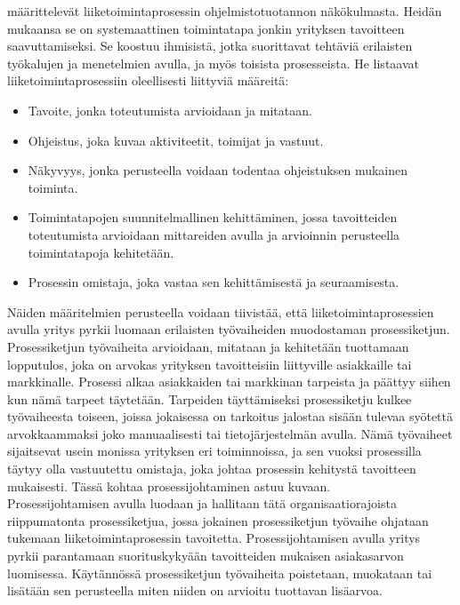 \documentclass[finnish,12pt,a4paper,pdftex]{article}
\begin{document}
\noindent \cite{okaytannot} määrittelevät liiketoimintaprosessin ohjelmistotuotannon näkökulmasta. Heidän mukaansa se on systemaattinen toimintatapa jonkin yrityksen tavoitteen saavuttamiseksi. Se koostuu ihmisistä, jotka suorittavat tehtäviä erilaisten työkalujen ja menetelmien avulla, ja myös toisista prosesseista. He listaavat liiketoimintaprosessiin oleellisesti liittyviä määreitä:

\begin{itemize}
\setlength{\itemsep}{0pt}
    \item Tavoite, jonka toteutumista arvioidaan ja mitataan.
    \item Ohjeistus, joka kuvaa aktiviteetit, toimijat ja vastuut.
    \item Näkyvyys, jonka perusteella voidaan todentaa ohjeistuksen mukainen toiminta.
    \item Toimintatapojen suunnitelmallinen kehittäminen, jossa tavoitteiden toteutumista arvioidaan mittareiden avulla ja arvioinnin perusteella toimintatapoja kehitetään.
    \item Prosessin omistaja, joka vastaa sen kehittämisestä ja seuraamisesta.
\end{itemize}

Näiden määritelmien perusteella voidaan tiivistää, että liiketoimintaprosessien avulla yritys pyrkii luomaan erilaisten työvaiheiden muodostaman prosessiketjun. Prosessiketjun työvaiheita arvioidaan, mitataan ja kehitetään tuottamaan lopputulos, joka on arvokas yrityksen tavoitteisiin liittyville asiakkaille tai markkinalle. Prosessi alkaa asiakkaiden tai markkinan tarpeista ja päättyy siihen kun nämä tarpeet täytetään. Tarpeiden täyttämiseksi prosessiketju kulkee työvaiheesta toiseen, joissa jokaisessa on tarkoitus jalostaa sisään tulevaa syötettä arvokkaammaksi joko manuaalisesti tai tietojärjestelmän avulla. Nämä työvaiheet sijaitsevat usein monissa yrityksen eri toiminnoissa, ja sen vuoksi prosessilla täytyy olla vastuutettu omistaja, joka johtaa prosessin kehitystä tavoitteen mukaisesti. Tässä kohtaa prosessijohtaminen astuu kuvaan.  \\

\noindent Prosessijohtamisen avulla luodaan ja hallitaan tätä organisaatiorajoista riippumatonta prosessiketjua, jossa jokainen prosessiketjun työvaihe ohjataan tukemaan liiketoimintaprosessin tavoitetta. Prosessijohtamisen avulla yritys pyrkii parantamaan suorituskykyään tavoitteiden mukaisen asiakasarvon luomisessa. Käytännössä prosessiketjun työvaiheita poistetaan, muokataan tai lisätään sen perusteella miten niiden on arvioitu tuottavan lisäarvoa. \citep{ohjelmistotuotanto}\\
\end{document}
